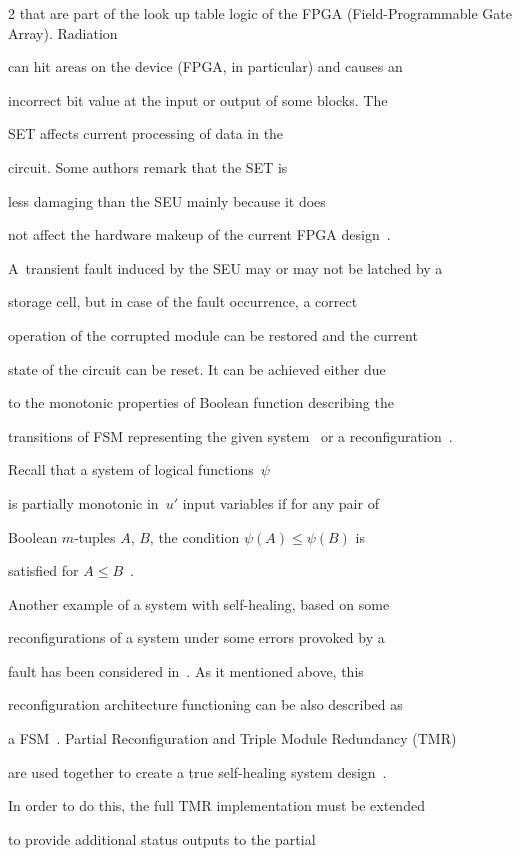 \begin{multicols}{2}
that are part of the look up table logic of the FPGA (Field-Programmable Gate Array). Radiation

can hit areas on the device (FPGA, in particular) and causes an

incorrect bit value at the input or output of some blocks. The

SET affects current processing of data in the

circuit. Some authors remark that the SET is

less damaging than the SEU mainly because it does

not affect the hardware makeup of the current FPGA design~\cite{5fr}.

A~transient fault induced by the SEU may or may not be latched by a

storage cell, but in case of the fault occurrence, a correct

operation of the corrupted module can be restored and the current

state of the circuit can be reset. It can be achieved either due

to the monotonic properties of Boolean function describing the

transitions of FSM representing the given system~\cite{5fr} or a reconfiguration~\cite{2fr}.

Recall that a system of logical functions~$\psi$

is partially monotonic in~$u'$ input variables if for any pair of

Boolean $m$-tuples $A$, $B$, the condition $\psi(A)\le \psi(B)$ is

satisfied for $A\le B$~\cite{6fr}.



Another example of a system with self-healing, based on some

reconfigurations of a system under some errors provoked by a

fault has been considered in~\cite{5fr}. As it mentioned above, this

reconfiguration architecture functioning can be also described as

a FSM~\cite{10fr}. Partial Reconfiguration and Triple Module Redundancy (TMR)

are used together to create a true self-healing system design~\cite{5fr}.

In order to do this, the full TMR implementation must be extended

to provide additional status outputs to the partial


\end{multicols}
